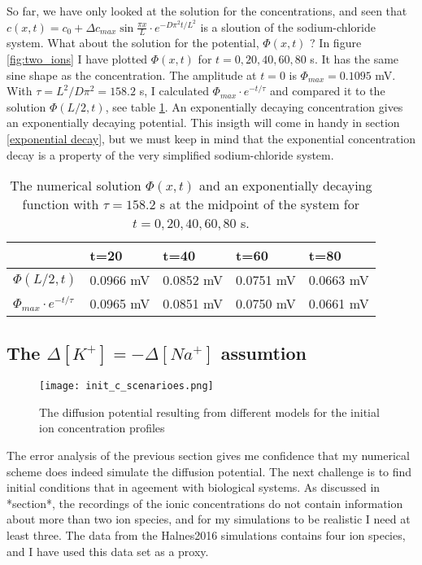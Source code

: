 \documentclass{article}
\begin{document}
So far, we have only looked at the solution for the concentrations, and seen that $c(x,t) =c_0 + \Delta c_{max} \sin \frac{ \pi x}{L}\cdot e^{-D\pi^2 t /L^2}$ is a sloution of the sodium-chloride system. What about the solution for the potential, $\Phi(x,t)$ ? In figure \ref{fig:two_ions} I have plotted $\Phi(x,t)$ for $t=0,20,40,60,80$ s. It has the same sine shape as the concentration. The amplitude at $t=0$ is $\Phi_{max} = 0.1095$ mV. With $\tau = L^2/D\pi^2 = 158.2$ s, I calculated $\Phi_{max} \cdot e^{-t/{\tau}}$ and compared it to the solution $\Phi(L/2,t)$, see table \ref{tab:error2}. An exponentially decaying concentration gives an exponentially decaying potential. This insigth will come in handy in section \ref{exponential decay}, but we must keep in mind that the exponential concentration decay is a property of the very simplified sodium-chloride system. 

\begin{table}[h!]
  \centering
  \caption{The numerical solution $\Phi(x,t)$ and an exponentially decaying function with $\tau = 158.2$ s at the midpoint of the system for $t=0,20,40,60,80$ s. }
  \label{tab:error2}
  \begin{tabular}{l||l|l|l|l}
 & t=20 & t=40 & t=60 & t=80\\
 \hline
$\Phi(L/2,t)$  & 0.0966 mV &  0.0852 mV & 0.0751 mV & 0.0663 mV\\
\hline
$\Phi_{max} \cdot e^{-t/{\tau}}$  & 0.0965 mV & 0.0851 mV & 0.0750 mV & 0.0661 mV\\


 \end{tabular}
\end{table}


\subsection{The $\Delta [K^+] = - \Delta [Na^+] $ assumtion}\label{The K/Na assumtion}

\begin{figure}
  \texttt{[image: init\_c\_scenarioes.png]}
  \caption{The diffusion potential resulting from different models for the initial ion concentration profiles}
  \label{fig:init_c_scenarioes}
\end{figure}
The error analysis of the previous section gives me confidence that my numerical scheme does indeed simulate the diffusion potential. The next challenge is to find initial conditions that in ageement with biological systems. As discussed in *section*, the recordings of the ionic concentrations do not contain information about more than two ion species, and for my simulations to be realistic I need at least three. The data from the Halnes2016 simulations contains four ion species, and I have used this data set as a proxy.
\end{document}
